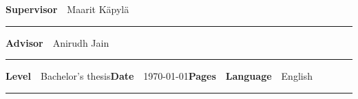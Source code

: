 \begin{spacing}{.88}
{	{\fontsize{10.5pt}{10.5pt}\bfseries\sffamily\lsstyle Supervisor}~~{\small Maarit Käpylä}

	\vspace{-2.4mm}\rule{\textwidth}{.75pt}

	{\fontsize{10.5pt}{10.5pt}\bfseries\sffamily\lsstyle Advisor}~~{\small Anirudh Jain}

	\vspace{-2.4mm}\rule{\textwidth}{.75pt}

	{\fontsize{10.5pt}{10.5pt}\bfseries\sffamily\lsstyle Level}~~{\small Bachelor's thesis}\hfill{\fontsize{10.5pt}{10.5pt}\bfseries\sffamily\lsstyle Date}~~{\small \today}\hfill{\fontsize{10.5pt}{10.5pt}\bfseries\sffamily\lsstyle Pages}~~{\small \pageref{LastPage}}\hfill{\fontsize{10.5pt}{10.5pt}\bfseries\sffamily\lsstyle Language}~~{\small English}

	\vspace{-2.4mm}\rule{\textwidth}{.75pt}

	\vspace{6mm}

	} %
\end{spacing}
